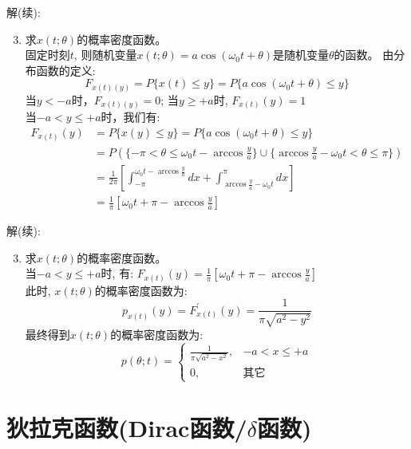 \begin{frame}
解(续):
\begin{enumerate}
	\setcounter{enumi}{2} %
	\item 求$x(t;\theta)$的概率密度函数。\\
	固定时刻$t$, 则随机变量$x(t;\theta)=a\cos(\omega_0t+\theta)$是随机变量$\theta$的函数。
	由分布函数的定义:
	$$F_{x(t)(y)}=P\{x(t)\le y\}=P\{a\cos(\omega_0t+\theta)\le y \}$$
	当$y<-a$时，$F_{x(t)(y)}=0$; 当$y\ge +a$时, $F_{x(t)}(y)=1$\\
	当$-a<y\le +a$时，我们有:
	\begin{align*}
	F_{x(t)}(y) &=P\{x(y)\le y \}=P\{a\cos(\omega_0t+\theta)\le y \}\\
	&=P(\{-\pi<\theta\le\omega_0t-\arccos\frac{y}{a} \} \cup \{\arccos\frac{y}{a}-\omega_0t<\theta\le\pi \})\\
	&=\frac{1}{2\pi}\left[\int_{-\pi}^{\omega_0t-\arccos\frac{y}{a}}dx+\int_{\arccos\frac{y}{a}-\omega_0t}^{\pi}dx\right]\\
	&=\frac{1}{\pi}[\omega_0t+\pi-\arccos\frac{y}{a}]
	\end{align*}	
\end{enumerate}
\end{frame}

\begin{frame}
解(续):
\begin{enumerate}
	\setcounter{enumi}{2} %
	\item 求$x(t;\theta)$的概率密度函数。\\
	当$-a<y\le +a$时, 有: $F_{x(t)}(y)=\frac{1}{\pi}[\omega_0t+\pi-\arccos\frac{y}{a}]$\\
	此时, $x(t;\theta)$的概率密度函数为:
	$$p_{x(t)}(y)=F_{x(t)}^\prime(y)=\frac{1}{\pi\sqrt{a^2-y^2}} $$
	最终得到$x(t;\theta)$的概率密度函数为:
	$$ p(\theta;t)=
	\begin{cases}
		\frac{1}{\pi\sqrt{a^2-x^2}}, &-a<x\le +a \\
		0,&\text{其它}
	\end{cases}
	$$
\end{enumerate}
\end{frame}

\section{狄拉克函数(Dirac函数/$\delta$函数)}

